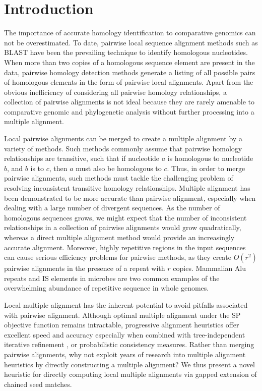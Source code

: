 \documentclass{llncs}
\begin{document}

\section{Introduction}
The importance of accurate homology identification to comparative
genomics can not be overestimated\cite{Kumar07}. To date, pairwise
local sequence alignment
methods such as BLAST \cite{ref-blastz,ref-ssearch,ref-pattern} have been the
prevailing technique to identify homologous nucleotides.  When more
than two copies of a homologous sequence element are present in the
data, pairwise homology detection methods generate a listing of all
possible pairs of homologous elements in the form of pairwise local
alignments.  Apart from the obvious inefficiency of considering all
pairwise homology relationships, a collection of pairwise alignments
is not ideal because they are rarely amenable to comparative genomic
and phylogenetic analysis without further processing into a multiple
alignment.

Local pairwise alignments can be merged to create a multiple alignment
by a variety of
methods\cite{ref-tba,ref-aba,ref-dialign,ref-related1}. Such methods
commonly assume that pairwise homology relationships are transitive,
such that if nucleotide $a$ is homologous to nucleotide $b$, and $b$
is to $c$, then $a$ must also be homologous to $c$.  Thus, in order to
merge pairwise alignments, such methods must tackle the challenging
problem of resolving inconsistent transitive homology relationships.
Multiple alignment has been demonstrated to be more accurate than
pairwise alignment, especially when dealing with a large number of
divergent sequences\cite{ref-mlagan,ref-aubergene}.  As the number of
homologous sequences grows, we might expect that the number of
inconsistent relationships in a collection of pairwise alignments
would grow quadratically, whereas a direct multiple alignment method
would provide an increasingly accurate alignment.  Moreover, highly
repetitive regions in the input sequences can cause serious efficiency
problems for pairwise methods, as they create $O(r^{2})$ pairwise
alignments in the presence of a repeat with $r$ copies.  Mammalian Alu
repeats and IS elements in microbes are two common examples of the
overwhelming abundance of repetitive sequence in whole genomes.

Local multiple alignment has the inherent potential to avoid pitfalls
associated with pairwise alignment. Although optimal multiple
alignment under the SP objective function remains
intractable\cite{ref-wangjiang}, progressive alignment heuristics
offer excellent speed and accuracy\cite{ref-clustalw,ref-tcoffee}
especially when combined with tree-independent iterative
refinement \cite{ref-muscle}, or probabilistic consistency
measures\cite{ref-probcons}. Rather than merging pairwise alignments,
why not exploit years of research into multiple alignment heuristics
by directly constructing a multiple alignment? We thus present a novel
heuristic for directly computing local multiple alignments via gapped
extension of chained seed matches.
\end{document}
